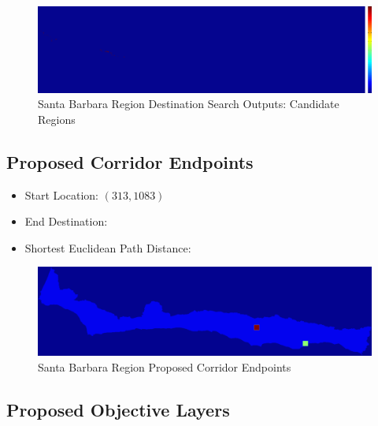         \begin{figure}[!h]
            \begin{center}
            \includegraphics[width=5.5in]{figures/SantaBarbara_Search_Output.png}   
            \caption{Santa Barbara Region Destination Search Outputs: Candidate Regions}
            \label{fig:SBdsoutputs_cand}
            \end{center}
        \end{figure}

    \subsection{Proposed Corridor Endpoints}
    
    \begin{itemize}
      \setlength{\itemsep}{0cm}
      \setlength{\parskip}{0cm}
        \item Start Location: $(313,1083)$
        \item End Destination:    
        \item Shortest Euclidean Path Distance: 
    \end{itemize}
    
        \begin{figure}[!h]
            \begin{center}
            \includegraphics[width=5.5in]{figures/SantaBarbara_Endpoints.png}   
            \caption{Santa Barbara Region Proposed Corridor Endpoints}
            \label{fig:SBendpoints}
            \end{center}
        \end{figure}
            
    \subsection{Proposed Objective Layers}


